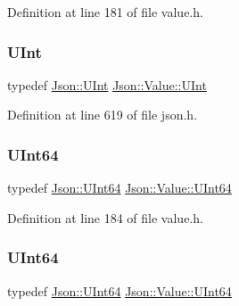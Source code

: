 Definition at line 181 of file value.\+h.

\hypertarget{class_json_1_1_value_a0933d59b45793ae4aade1757c322a98d}{}\label{class_json_1_1_value_a0933d59b45793ae4aade1757c322a98d} 
\subsubsection{\texorpdfstring{U\+Int}{UInt}\hspace{0.1cm}{\footnotesize\ttfamily [2/2]}}
{\footnotesize\ttfamily typedef \hyperlink{namespace_json_a800fb90eb6ee8d5d62b600c06f87f7d4}{Json\+::\+U\+Int} \hyperlink{class_json_1_1_value_a0933d59b45793ae4aade1757c322a98d}{Json\+::\+Value\+::\+U\+Int}}



Definition at line 619 of file json.\+h.

\hypertarget{class_json_1_1_value_a8b62564be8c087c6d18de180ff4e13e3}{}\label{class_json_1_1_value_a8b62564be8c087c6d18de180ff4e13e3} 
\subsubsection{\texorpdfstring{U\+Int64}{UInt64}\hspace{0.1cm}{\footnotesize\ttfamily [1/2]}}
{\footnotesize\ttfamily typedef \hyperlink{namespace_json_adf3fa5cb60c619e4f02315ad355e0ca1}{Json\+::\+U\+Int64} \hyperlink{class_json_1_1_value_a8b62564be8c087c6d18de180ff4e13e3}{Json\+::\+Value\+::\+U\+Int64}}



Definition at line 184 of file value.\+h.

\hypertarget{class_json_1_1_value_a8b62564be8c087c6d18de180ff4e13e3}{}\label{class_json_1_1_value_a8b62564be8c087c6d18de180ff4e13e3} 
\subsubsection{\texorpdfstring{U\+Int64}{UInt64}\hspace{0.1cm}{\footnotesize\ttfamily [2/2]}}
{\footnotesize\ttfamily typedef \hyperlink{namespace_json_adf3fa5cb60c619e4f02315ad355e0ca1}{Json\+::\+U\+Int64} \hyperlink{class_json_1_1_value_a8b62564be8c087c6d18de180ff4e13e3}{Json\+::\+Value\+::\+U\+Int64}}



